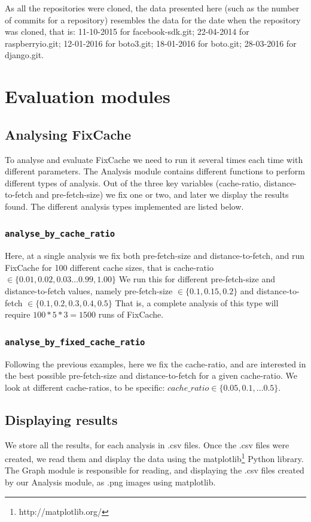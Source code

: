 \documentclass[12pt,twoside,notitlepage]{report}
\newcommand{\fxch}{FixCache}
\begin{document}
As all the repositories were cloned, the data presented here (such as the number of commits for a repository) resembles the data for the date when the repository was cloned, that is: 11-10-2015 for facebook-sdk.git; 22-04-2014 for raspberryio.git; 12-01-2016 for boto3.git; 18-01-2016 for boto.git; 28-03-2016 for django.git.
\section{Evaluation modules}
\subsection{Analysing \fxch{}}
To analyse and evaluate \fxch{} we need to run it several times each time with different parameters. The Analysis module contains different functions to perform different types of analysis. Out of the three key variables (cache-ratio, distance-to-fetch and pre-fetch-size) we fix one or two, and later we display the results found. The different analysis types implemented are listed below.
\subsubsection{\texttt{analyse\_by\_cache\_ratio}}Here, at a single analysis we fix both pre-fetch-size and distance-to-fetch, and run \fxch{} for 100 different cache sizes, that is cache-ratio $\in \{0.01, 0.02, 0.03 \dots 0.99, 1.00\}$ We run this for different pre-fetch-size and distance-to-fetch values, namely pre-fetch-size $\in \{0.1, 0.15, 0.2\}$ and distance-to-fetch $\in \{0.1, 0.2, 0.3, 0.4, 0.5\}$ That is, a complete analysis of this type will require $100*5*3=1500$ runs of \fxch{}.
\subsubsection{\texttt{analyse\_by\_fixed\_cache\_ratio}} 
Following the previous examples, here we fix the cache-ratio, and are interested in the best possible pre-fetch-size and distance-to-fetch for a given cache-ratio. We look at different cache-ratios, to be specific: $cache\_ratio \in \{0.05, 0.1, \dots 0.5\}$. 
\subsection{Displaying results}
We store all the results, for each analysis in .csv files. Once the .csv files were created, we read them and display the data using the matplotlib\footnote{http://matplotlib.org/} Python library. The Graph module is responsible for reading, and displaying the .csv files created by our Analysis module, as .png images using matplotlib.
\end{document}

